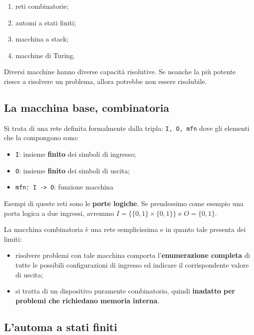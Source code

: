 \documentclass[11pt]{book}
\begin{document}
\begin{enumerate}
\item reti combinatorie;
\item automi a stati finiti;
\item macchina a stack;
\item macchine di Turing.
\end{enumerate}

Diversi macchine hanno diverse capacit\`a risolutive. Se neanche la
pi\`u potente riesce a risolvere un problema, allora potrebbe non
essere risolubile.


\subsection{La macchina base, combinatoria}

Si trata di una rete definita formalmente dalla tripla: \texttt{I, O,
  mfn} dove gli elementi che la compongono sono:

\begin{itemize}
\item \texttt{I}: insieme \textbf{finito} dei simboli di ingresso;
\item \texttt{O}: insieme \textbf{finito} dei simboli di uscita;
\item \texttt{mfn: I -> O}: funzione macchina
\end{itemize}

Esempi di queste reti sono le \textbf{porte logiche}. Se prendessimo
come esempio una porta logica a due ingressi, avremmo
$I=\{\{0,1\} \times \{0, 1\}\}$ e $O=\{0,1\}$.


La macchina combinatoria \`e una rete semplicissima e in quanto tale
presenta dei limiti:

\begin{itemize}
\item risolvere problemi con tale macchina comporta
  l'\textbf{enumerazione completa} di tutte le possibili
  configurazioni di ingresso ed indicare il corrispondente valore di
  uscita;
\item si tratta di un dispositivo puramente combinatorio, quindi
  \textbf{inadatto per problemi che richiedano memoria interna}.
\end{itemize}


\subsection{L'automa a stati finiti}
\end{document}
